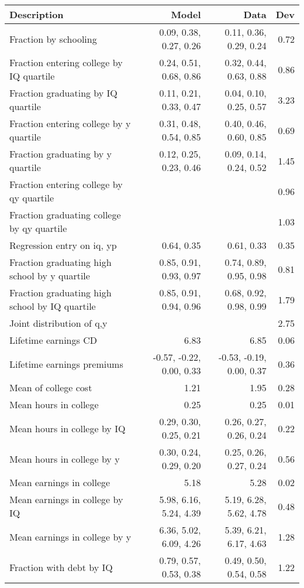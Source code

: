 \begin{tabular}{lrrr}
\hline
Description & Model  & Data  & Dev  \\ 
\hline
Fraction by schooling & 0.09, 0.38, 0.27, 0.26  & 0.11, 0.36, 0.29, 0.24  & 0.72  \\ 
Fraction entering college by IQ quartile & 0.24, 0.51, 0.68, 0.86  & 0.32, 0.44, 0.63, 0.88  & 0.86  \\ 
Fraction graduating by IQ quartile & 0.11, 0.21, 0.33, 0.47  & 0.04, 0.10, 0.25, 0.57  & 3.23  \\ 
Fraction entering college by y quartile & 0.31, 0.48, 0.54, 0.85  & 0.40, 0.46, 0.60, 0.85  & 0.69  \\ 
Fraction graduating by y quartile & 0.12, 0.25, 0.23, 0.46  & 0.09, 0.14, 0.24, 0.52  & 1.45  \\ 
Fraction entering college by qy quartile &   &   & 0.96  \\ 
Fraction graduating college by qy quartile &   &   & 1.03  \\ 
Regression entry on iq, yp & 0.64, 0.35  & 0.61, 0.33  & 0.35  \\ 
Fraction graduating high school by y quartile & 0.85, 0.91, 0.93, 0.97  & 0.74, 0.89, 0.95, 0.98  & 0.81  \\ 
Fraction graduating high school by IQ quartile & 0.85, 0.91, 0.94, 0.96  & 0.68, 0.92, 0.98, 0.99  & 1.79  \\ 
Joint distribution of q,y &   &   & 2.75  \\ 
Lifetime earnings CD & 6.83  & 6.85  & 0.06  \\ 
Lifetime earnings premiums & -0.57, -0.22, 0.00, 0.33  & -0.53, -0.19, 0.00, 0.37  & 0.36  \\ 
Mean of college cost & 1.21  & 1.95  & 0.28  \\ 
Mean hours in college & 0.25  & 0.25  & 0.01  \\ 
Mean hours in college by IQ & 0.29, 0.30, 0.25, 0.21  & 0.26, 0.27, 0.26, 0.24  & 0.22  \\ 
Mean hours in college by y & 0.30, 0.24, 0.29, 0.20  & 0.25, 0.26, 0.27, 0.24  & 0.56  \\ 
Mean earnings in college & 5.18  & 5.28  & 0.02  \\ 
Mean earnings in college by IQ & 5.98, 6.16, 5.24, 4.39  & 5.19, 6.28, 5.62, 4.78  & 0.48  \\ 
Mean earnings in college by y & 6.36, 5.02, 6.09, 4.26  & 5.39, 6.21, 6.17, 4.63  & 1.28  \\ 
Fraction with debt by IQ & 0.79, 0.57, 0.53, 0.38  & 0.49, 0.50, 0.54, 0.58  & 1.22  \\ 

\end{tabular}
